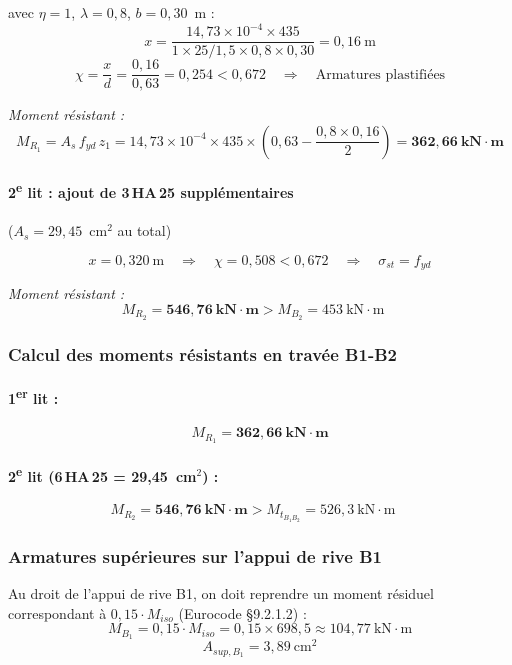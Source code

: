 avec $\eta = 1$, $\lambda = 0{,}8$, $b = 0{,}30$~m :
\[
  x = \frac{14{,}73 \times 10^{-4} \times 435}{1 \times 25/1{,}5 \times 0{,}8 \times 0{,}30}
    = 0{,}16~\text{m}
\]
\[
  \chi = \frac{x}{d} = \frac{0{,}16}{0{,}63} = 0{,}254 < 0{,}672 \quad\Longrightarrow\quad \text{Armatures plastifiées}
\]

\textit{Moment résistant :}
\[
  M_{R_1} = A_s\,f_{yd}\,z_1
          = 14{,}73 \times 10^{-4} \times 435 \times \left(0{,}63 - \frac{0{,}8 \times 0{,}16}{2}\right)
          = \mathbf{362{,}66~\text{kN}\cdot\text{m}}
\]

\paragraph{2\textsuperscript{e} lit : ajout de 3\,HA\,25 supplémentaires} ($A_s = 29{,}45$~cm$^2$ au total)

\[
  x = 0{,}320~\text{m} \quad\Longrightarrow\quad \chi = 0{,}508 < 0{,}672 \quad\Longrightarrow\quad \sigma_{st} = f_{yd}
\]

\textit{Moment résistant :}
\[
  M_{R_2} = \mathbf{546{,}76~\text{kN}\cdot\text{m}} > M_{B_2} = 453~\text{kN}\cdot\text{m} \quad
\]

\subsubsection{Calcul des moments résistants en travée B1-B2}

\paragraph{1\textsuperscript{er} lit :}
\[
  M_{R_1} = \mathbf{362{,}66~\text{kN}\cdot\text{m}}
\]

\paragraph{2\textsuperscript{e} lit (6\,HA\,25 = 29,45~cm$^2$) :}
\[
  M_{R_2} = \mathbf{546{,}76~\text{kN}\cdot\text{m}} > M_{t_{B_1B_2}} = 526{,}3~\text{kN}\cdot\text{m} \quad
\]

\subsubsection{Armatures supérieures sur l'appui de rive B1}

Au droit de l'appui de rive B1, on doit reprendre un moment résiduel correspondant à $0{,}15 \cdot M_{iso}$ (Eurocode \S{}9.2.1.2) :
\[
  M_{B_1} = 0{,}15 \cdot M_{iso} = 0{,}15 \times 698{,}5 \approx 104{,}77~\text{kN}\cdot\text{m}
\]
\[
  A_{sup,B_1} = 3{,}89~\text{cm}^2
\]

